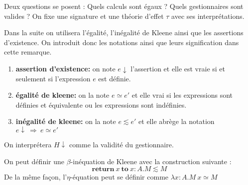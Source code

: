 Deux questions se posent : Quels calculs sont égaux ? Quels gestionnaires sont valides ?
\smallbreak
On fixe une signature et une théorie d'effet $\tau$ avec ses interprétations. 

\begin{remark}
	Dans la suite on utilisera l'égalité, l'inégalité de Kleene ainsi que les assertions d'existence. On introduit donc les notations ainsi que leurs signification dans cette remarque.
	
	\begin{enumerate}
		\item[] \textbf{assertion d'existence:} on note $e \downarrow$ l'assertion et elle est vraie si et seulement si l'expression $e$ est définie.
		\item[] \textbf{égalité de kleene:} on la note $e \simeq e'$ et elle vrai si les expressions sont définies et équivalente ou les expressions sont indéfinies.
		\item[] \textbf{inégalité de kleene:} on la note $e \lesssim e'$ et elle abrège la notation $e \downarrow~\Rightarrow~e \simeq e'$
	\end{enumerate}

	On interprétera $H\downarrow$ comme la validité du gestionnaire. 
\end{remark}
\medbreak

\begin{exemple}
	On peut définir une $\beta$-inéquation de Kleene avec la construction suivante : 
	\[\textbf{return}~x~\textbf{to}~x:A. M \lesssim M\]
	De la même façon, l'$\eta$-équation peut se définir comme
	$\lambda x:A.M~x \simeq M$
\end{exemple}



